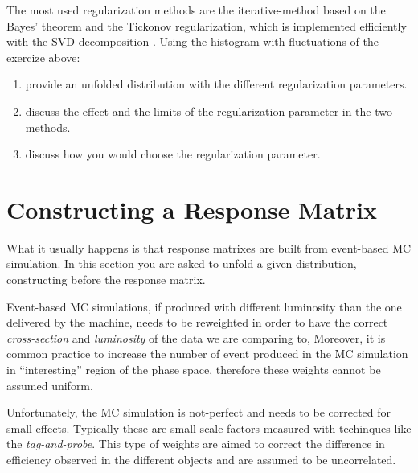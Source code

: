 \documentclass[a4paper,11pt]{article}
\begin{document}
The most used regularization methods are the iterative-method based on the Bayes' theorem \cite{dAgostini} and the Tickonov regularization, which is implemented efficiently with the \gls{SVD} decomposition \cite{SVD}.
Using the histogram with fluctuations of the exercize above:
\begin{enumerate}
	\item provide an unfolded distribution with the different regularization parameters.
	\item discuss the effect and the limits of the regularization parameter in the two methods.
	\item discuss how you would choose the regularization parameter.
\end{enumerate}

\section{Constructing a Response Matrix}

What it usually happens is that response matrixes are built from event-based \gls{MC} simulation.
In this section you are asked to unfold a given distribution, constructing before the response matrix.

Event-based \gls{MC} simulations, 
if produced with different luminosity than the one delivered by the machine, needs to be reweighted 
in order to have the correct \emph{cross-section} and \emph{luminosity} of the data we are comparing to,
Moreover, it is common practice to increase the number of event produced in the \gls{MC} simulation in ``interesting'' 
region of the phase space, therefore these weights cannot be assumed uniform.

Unfortunately, the \gls{MC} simulation is not-perfect and needs to be corrected for small effects.
Typically these are small scale-factors measured with techinques like the \emph{tag-and-probe}. 
This type of weights are aimed to correct the difference in efficiency observed in the different objects 
and are assumed to be uncorrelated.


\FloatBarrier
\nocite{*}
%


\cleardoublepage
\end{document}
